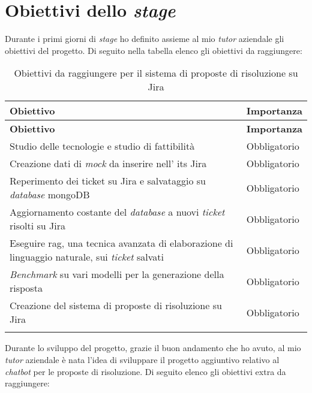\section{Obiettivi dello \textit{stage}}
Durante i primi giorni di \textit{stage} ho definito assieme al mio \textit{tutor} aziendale gli obiettivi del progetto.
Di seguito nella tabella elenco gli obiettivi da raggiungere:
\renewcommand{\arraystretch}{2}
\begin{longtable}{|p{10cm}|p{2cm}|}
    \hline
    \rowcolor{tableheader}\textbf{Obiettivo} & \textbf{Importanza} \\
    \hline
    \endfirsthead

    \rowcolor{tableheader}\textbf{Obiettivo} & \textbf{Importanza} \\
    \hline
    \endhead

    \hline
    \endfoot

    \hline
    \endlastfoot
    \rowcolor{tableoddrow} Studio delle tecnologie e studio di fattibilità & Obbligatorio \\
    \hline
    \rowcolor{tableevenrow} Creazione dati di \textit{mock} da inserire nell' \gls{its} Jira & Obbligatorio \\
    \hline
    \rowcolor{tableoddrow} Reperimento dei ticket su Jira e salvataggio su \textit{database} mongoDB & Obbligatorio \\
    \hline
    \rowcolor{tableoddrow} Aggiornamento costante del \textit{database} a nuovi \textit{ticket} risolti su Jira & Obbligatorio \\
    \hline
    \rowcolor{tableoddrow} Eseguire \gls{rag}, una tecnica avanzata di elaborazione di linguaggio naturale, sui \textit{ticket} salvati & Obbligatorio \\
    \hline
    \rowcolor{tableoddrow} \textit{Benchmark} su vari modelli per la generazione della risposta & Obbligatorio \\
    \hline
    \rowcolor{tableoddrow} Creazione del sistema di proposte di risoluzione su Jira & Obbligatorio \\
    \hline
    \caption{Obiettivi da raggiungere per il sistema di proposte di risoluzione su Jira}
    \label{tab:obiettiviJira}
\end{longtable}
\noindent
Durante lo sviluppo del progetto, grazie il buon andamento che ho avuto, al mio \textit{tutor} aziendale è nata l'idea di sviluppare il progetto aggiuntivo relativo al \textit{chatbot} per le proposte di risoluzione.
Di seguito elenco gli obiettivi extra da raggiungere:
